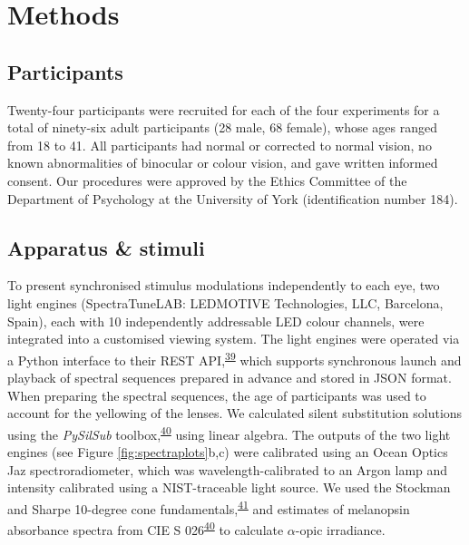 \documentclass[
]{article}
\begin{document}
\hypertarget{methods}{%
\section{Methods}\label{methods}}

\hypertarget{participants}{%
\subsection{Participants}\label{participants}}

Twenty-four participants were recruited for each of the four experiments for a total of ninety-six adult participants (28 male, 68 female), whose ages ranged from 18 to 41. All participants had normal or corrected to normal vision, no known abnormalities of binocular or colour vision, and gave written informed consent. Our procedures were approved by the Ethics Committee of the Department of Psychology at the University of York (identification number 184).

\hypertarget{apparatus-stimuli}{%
\subsection{Apparatus \& stimuli}\label{apparatus-stimuli}}

To present synchronised stimulus modulations independently to each eye, two light engines (SpectraTuneLAB: LEDMOTIVE Technologies, LLC, Barcelona, Spain), each with 10 independently addressable LED colour channels, were integrated into a customised viewing system. The light engines were operated via a Python interface to their REST API,\textsuperscript{\protect\hyperlink{ref-Martin2022}{39}} which supports synchronous launch and playback of spectral sequences prepared in advance and stored in JSON format. When preparing the spectral sequences, the age of participants was used to account for the yellowing of the lenses. We calculated silent substitution solutions using the \emph{PySilSub} toolbox,\textsuperscript{\protect\hyperlink{ref-Martin2023}{40}} using linear algebra. The outputs of the two light engines (see Figure \ref{fig:spectraplots}b,c) were calibrated using an Ocean Optics Jaz spectroradiometer, which was wavelength-calibrated to an Argon lamp and intensity calibrated using a NIST-traceable light source. We used the Stockman and Sharpe 10-degree cone fundamentals,\textsuperscript{\protect\hyperlink{ref-Stockman2000}{41}} and estimates of melanopsin absorbance spectra from CIE S 026\textsuperscript{\protect\hyperlink{ref-Martin2023}{40}} to calculate \(\alpha\)-opic irradiance.
\end{document}
